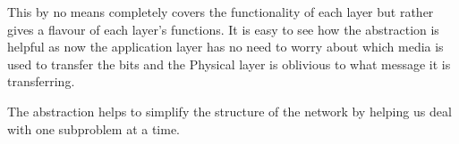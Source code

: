 \documentclass[12pt]{article}
\newcommand{\tbox}[1]{\noindent\fbox{\parbox{\textwidth}{#1}}}
\begin{document}
This by no means completely covers the functionality of each layer but rather gives a flavour of each layer's functions. It is easy to see 
how the abstraction is helpful as now the application layer has no need to worry about which media is used to transfer the bits 
and the Physical layer is oblivious to what message it is transferring. 

The abstraction helps to simplify the structure of the network by helping us deal with one subproblem at a time. 



\noindent\tbox{
    \begin{center}
    \textbf{\Huge Lecture 2}
    \end{center}
}










\end{document}
